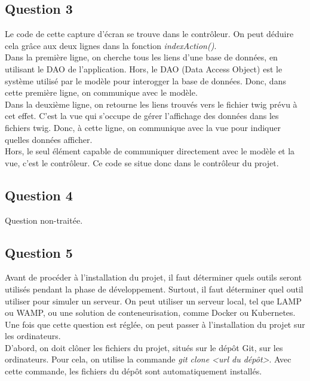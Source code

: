 \documentclass[12pt,a4paper]{article}
\begin{document}
	 \subsection*{Question 3}

	Le code de cette capture d'écran se trouve dans le contrôleur. On peut déduire cela grâce aux deux lignes dans la fonction \textit{indexAction()}. \\
	
	Dans la première ligne, on cherche tous les liens d'une base de données, en utilisant le DAO de l'application. Hors, le DAO (Data Access Object) est le système utilisé par le modèle pour interogger la base de données. Donc, dans cette première ligne, on communique avec le modèle. \\
	
	Dans la deuxième ligne, on retourne les liens trouvés vers le fichier twig prévu à cet effet. C'est la vue qui s'occupe de gérer l'affichage des données dans les fichiers twig. Donc, à cette ligne, on communique avec la vue pour indiquer quelles données afficher. \\
	
Hors, le seul élément capable de communiquer directement avec le modèle et la vue, c'est le contrôleur. Ce code se situe donc dans le contrôleur du projet.

	\subsection*{Question 4}

	Question non-traitée.

	 \subsection*{Question 5}
	 
	 Avant de procéder à l'installation du projet, il faut déterminer quels outils seront utilisés pendant la phase de développement. Surtout, il faut déterminer quel outil utiliser pour simuler un serveur. On peut utiliser un serveur local, tel que LAMP ou WAMP, ou une solution de conteneurisation, comme Docker ou Kubernetes. Une fois que cette question est réglée, on peut passer à l'installation du projet sur les ordinateurs. \\
	 
	 D'abord, on doit clôner les fichiers du projet, situés sur le dépôt Git, sur les ordinateurs. Pour cela, on utilise la commande \textit{git clone <url du dépôt>}. Avec cette commande, les fichiers du dépôt sont automatiquement installés. \\
	 
\end{document}
